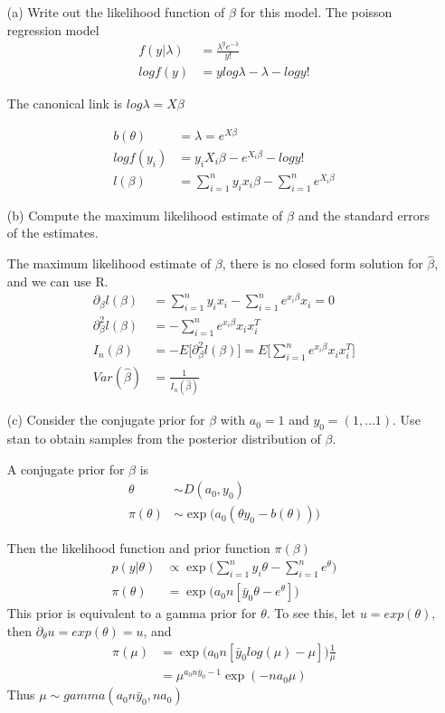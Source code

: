 \begin{itemize}
\item[(a)] Write out the likelihood function of $\beta$ for this model. 
The poisson regression model
\begin{align*}
f(y|\lambda) &= \frac{\lambda^y e^{-\lambda}}{y!} \\
log f(y) &=y log \lambda  - \lambda - log y!
\end{align*}

The canonical link is $ log \lambda=  X\beta$

\begin{align*}
b(\theta) &= \lambda = e^{X \beta} \\
log f(y_i) &= y_i X_i \beta -  e^{X_i \beta}  - log y! \\
l(\beta) &= \sum_{i=1}^n y_i x_i \beta - \sum_{i=1}^n e^{X_i \beta}
\end{align*}

\item[(b)] Compute the maximum likelihood estimate of $\beta$ and the standard errors of the estimates. 

The maximum likelihood estimate of $\beta$, there is no closed form solution for $\hat{\beta}$, and we can use R.
\begin{align*}
\partial_{\beta} l(\beta) &= \sum_{i=1}^n y_i x_i  - \sum_{i=1}^n e^{x_i \beta} x_i  = 0 \\
\partial_{\beta}^2 l(\beta) &= - \sum_{i=1}^n e^{x_i \beta} x_i x_i^T \\
I_n(\beta) &= - E \big[ \partial_{\beta}^2 l(\beta) \big] = E \big[\sum_{i=1}^n e^{x_i \beta} x_i x_i^T \big] \\
Var(\hat{\beta}) &= \frac{1}{I_n(\hat{\beta})}
\end{align*}

\item[(c)] Consider the conjugate prior for $\beta$ with $a_0 = 1$ and $y_0 = (1,...1)$. Use stan to obtain samples from the posterior distribution of $\beta$. 

A conjugate prior for $\beta$ is 
\begin{align*}
\theta & \sim D(a_0, y_0) \\
\pi(\theta) & \sim \exp \big( a_0 (\theta y_0 - b(\theta)) \big) 
\end{align*}

Then the likelihood function and prior function $\pi(\beta)$
\begin{align*}
p(y| \theta) & \propto \exp \big( \sum_{i=1}^n y_i \theta - \sum_{i=1}^n e^{\theta} \big) \\
\pi(\theta) &= \exp \big(a_0 n [ \bar{y}_0 \theta - e^{\theta} ] \big) 
\end{align*}
This prior is equivalent to a gamma prior for $\theta$. To see this, let $u = exp(\theta)$, then $\partial_{\theta} u = exp(\theta) = u $, and
\begin{align*}
\pi(\mu) &= \exp \big(a_0 n [ \bar{y}_0 log(\mu) - \mu ] \big) \frac{1}{\mu} \\
&= \mu^{a_0 n \bar{y}_0 -1 } \exp(-n a_0 \mu)
\end{align*}
Thus $\mu \sim gamma(a_0 n \bar{y}_0, n a_0)$


\end{itemize}
